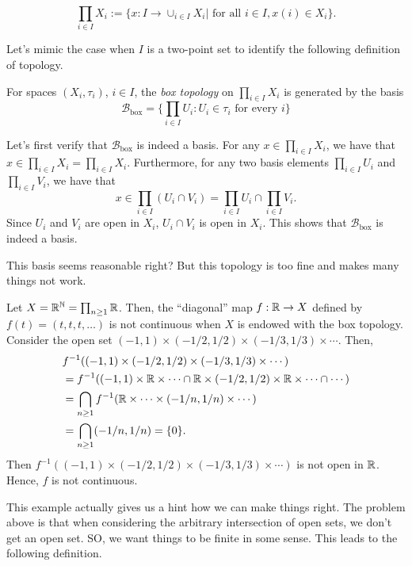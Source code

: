 \[
\prod_{i\in I} X_i := \{ x:I\to \cup_{i\in I} X_i | \text{ for all } i\in I, x(i)\in X_i \}.
\]

Let's mimic the case when $I$ is a two-point set to identify the following definition of topology.

\begin{definition}
For spaces $(X_i,{\tau}_i)$, $i\in I$, the \emph{box topology} on $\prod_{i\in I}X_i$ is generated by the basis
\[
\mathcal{B}_{\text{box}}=\Big\{\prod_{i\in I}U_i : U_i\in{\tau}_i\text{ for every }i\Big\}
\]
\end{definition}

Let's first verify that $\mathcal{B}_{\text{box}}$ is indeed a basis. For any $x\in \prod_{i\in I} X_i$, we have that $x\in \prod_{i\in I} X_i = \prod_{i\in I} X_i$. Furthermore, for any two basis elements $\prod_{i\in I} U_i$ and $\prod_{i\in I} V_i$, we have that
\[x\in \prod_{i\in I} (U_i\cap V_i) =\prod_{i\in I} U_i \cap \prod_{i\in I} V_i.\]
Since $U_i$ and $V_i$ are open in $X_i$, $U_i\cap V_i$ is open in $X_i$. This shows that $\mathcal{B}_{\text{box}}$ is indeed a basis.

This basis seems reasonable right? But this topology is too fine and makes many things not work. 

\begin{example}
Let $X=\mathbb{R}^{\mathbb{N}}=\prod_{n\ge1}\mathbb{R}$. Then, the ``diagonal'' map $f:\mathbb{R}\to X$ defined by $f(t)=(t,t,t,\ldots)$ is not continuous when $X$ is endowed with the box topology. Consider the open set $(-1,1)\times (-1/2,1/2)\times (-1/3,1/3)\times \cdots$. Then, 
\begin{align*}
&f^{-1}((-1,1)\times (-1/2,1/2)\times (-1/3,1/3)\times \cdots)\\
 &= f^{-1}((-1,1)\times\mathbb{R}\times\cdots\cap\mathbb{R}\times (-1/2,1/2)\times\mathbb{R}\times\cdots\cap\cdots)\\
&=\bigcap_{n\ge1} f^{-1}(\mathbb{R}\times\cdots\times (-1/n,1/n)\times \cdots)\\
&=\bigcap_{n\ge1} (-1/n,1/n) = \{0\}.
\end{align*}
Then $f^{-1}((-1,1)\times (-1/2,1/2)\times (-1/3,1/3)\times \cdots)$ is not open in $\mathbb{R}$. Hence, $f$ is not continuous.

\end{example}

This example actually gives us a hint how we can make things right. The problem above is that when considering the arbitrary intersection of open sets, we don't get an open set. SO, we want things to be finite in some sense. This leads to the following definition.

